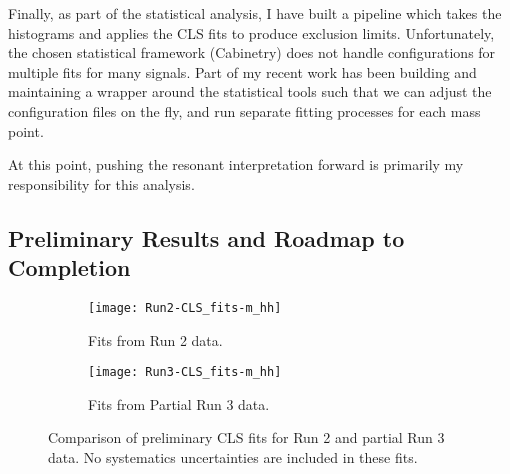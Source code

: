 \documentclass[12pt]{article}
\begin{document}
Finally, as part of the statistical analysis, I have built a pipeline which
takes the histograms and applies the CLS fits to produce exclusion limits.
Unfortunately, the chosen statistical framework (Cabinetry) \cite{cabinetry}
does not handle configurations for multiple fits for many signals. Part of my
recent work has been building and maintaining a wrapper around the statistical
tools such that we can adjust the configuration files on the fly, and run
separate fitting processes for each mass point.

At this point, pushing the resonant interpretation forward is primarily my
responsibility for this analysis.



\subsection{Preliminary Results and Roadmap to Completion}

\begin{figure}[t]
    \centering
    \begin{subfigure}[t]{.48\textwidth}
        \centering
        \texttt{[image: Run2-CLS\_fits-m\_hh]}
        \caption{Fits from Run 2 data.}
        \label{subfig:cls-run2}
    \end{subfigure}
    \begin{subfigure}[t]{.48\textwidth}
        \centering
        \texttt{[image: Run3-CLS\_fits-m\_hh]}
        \caption{Fits from Partial Run 3 data.}
        \label{subfig:cls-run3}
    \end{subfigure}
\caption{Comparison of preliminary CLS fits for Run 2 and partial Run 3 data. No
systematics uncertainties are included in these fits.}
\label{fig:cls_fit_results}
\end{figure}
\end{document}
